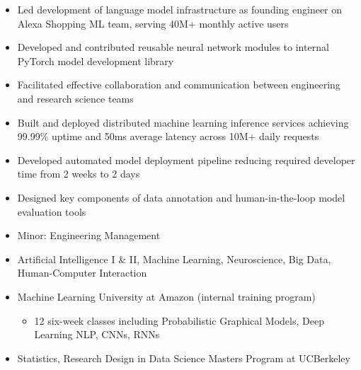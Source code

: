 \documentclass{my_cv}
\begin{document}
\begin{adjustwidth}{2em}{0em}
\vspace{1em}


\begin{itemize}
   \item Led development of language model infrastructure as founding engineer on Alexa Shopping ML team, serving 40M+ monthly active users
\item Developed and contributed reusable neural network modules to internal PyTorch model development library
\item Facilitated effective collaboration and communication between engineering and research science teams
\item Built and deployed distributed machine learning inference services achieving 99.99\% uptime and 50ms average latency across 10M+ daily requests
\item Developed automated model deployment pipeline reducing required developer time from 2 weeks to 2 days
\item Designed key components of data annotation and human-in-the-loop model evaluation tools
\end{itemize}

\end{adjustwidth}

\vspace{1em}

\begin{adjustwidth}{2em}{0em}

\begin{itemize}
    \item Minor: Engineering Management
    \item Artificial Intelligence I \& II, Machine Learning, Neuroscience, Big Data, Human-Computer Interaction
\end{itemize}

\begin{itemize}
    \item Machine Learning University at Amazon (internal training program)
    \begin{itemize}
        \item 12 six-week classes including Probabilistic Graphical Models, Deep Learning NLP, CNNs, RNNs
    \end{itemize}
    \item Statistics, Research Design in Data Science Masters Program at UCBerkeley
\end{itemize}

\end{adjustwidth}
\vspace{1em}
\end{document}
